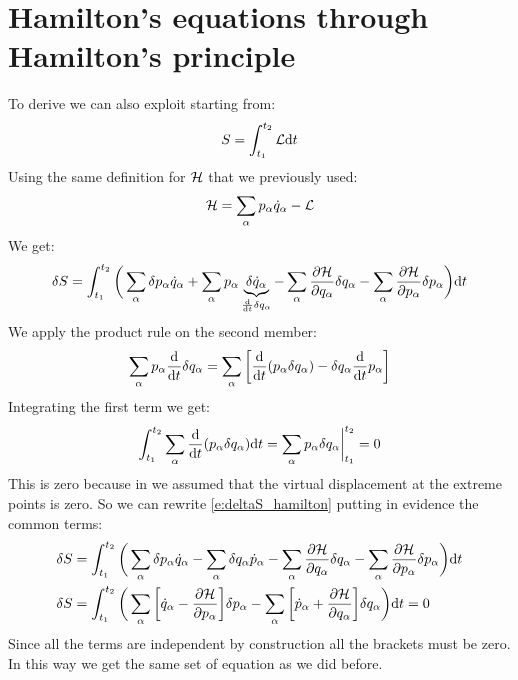 \section{Hamilton's equations through Hamilton's principle}
To derive \hamiltonref\;we can also exploit \hpquotemath\;starting from:
\begin{equation}
    S = \int_{t_1}^{t_2}\mathcal{L} \mathrm{d}t
\end{equation}
Using the same definition for $\mathcal{H}$ that we previously used:
\begin{equation}
    \mathcal{H} = \displaystyle\sum_{\alpha}p_{\alpha}\dot{q}_{\alpha} - \mathcal{L}
\end{equation}
We get:
\begin{equation} \label{e:deltaS_hamilton}
    \delta S = \int_{t_1}^{t_2}\bigg(\displaystyle\sum_{\alpha}\delta p_{\alpha}\dot{q}_{\alpha} + \displaystyle\sum_{\alpha} p_{\alpha} \underbrace{\delta \dot{q}_{\alpha}}_{\frac{\mathrm{d}}{\mathrm{d}t}\delta q_{\alpha}} - \displaystyle\sum_{\alpha} \dfrac{\partial \mathcal{H}}{\partial q_{\alpha}} \delta q_{\alpha}- \displaystyle\sum_{\alpha} \dfrac{\partial \mathcal{H}}{\partial p_{\alpha}} \delta p_{\alpha}\bigg) \mathrm{d}t
\end{equation}
We apply the product rule on the second member:
\begin{equation}
    \displaystyle\sum_{\alpha} p_{\alpha} \dfrac{\mathrm{d} }{\mathrm{d}t}\delta q_{\alpha} = \displaystyle\sum_{\alpha} \bigg[ \dfrac{\mathrm{d} }{\mathrm{d}t}(p_{\alpha} \delta q_{\alpha}) -  \delta q_{\alpha}\dfrac{\mathrm{d} }{\mathrm{d}t}p_{\alpha}\bigg]
\end{equation}
Integrating the first term we get:
\begin{equation}
    \int_{t_1}^{t_2} \displaystyle\sum_{\alpha} \dfrac{\mathrm{d} }{\mathrm{d}t}(p_{\alpha} \delta q_{\alpha}) \mathrm{d}t = \displaystyle\sum_{\alpha} p_{\alpha} \delta q_{\alpha} \bigg|_{t_1}^{t_2} = 0
\end{equation}
This is zero because in \hpquotemath\;we assumed that the virtual displacement at the extreme points is zero. So we can rewrite \eqref{e:deltaS_hamilton} putting in evidence the common terms:
\begin{equation}
    \begin{split}
        \delta S &= \int_{t_1}^{t_2}\bigg(\displaystyle\sum_{\alpha}\delta p_{\alpha}\dot{q}_{\alpha} - \displaystyle\sum_{\alpha} \delta q_{\alpha}\dot{p}_{\alpha} - \displaystyle\sum_{\alpha} \dfrac{\partial \mathcal{H}}{\partial q_{\alpha}} \delta q_{\alpha}- \displaystyle\sum_{\alpha} \dfrac{\partial \mathcal{H}}{\partial p_{\alpha}} \delta p_{\alpha}\bigg) \mathrm{d}t \\
        \delta S &= \int_{t_1}^{t_2}\bigg(\displaystyle\sum_{\alpha}\bigg[\dot{q}_{\alpha} - \dfrac{\partial \mathcal{H}}{\partial p_{\alpha}}\bigg] \delta p_{\alpha} - \displaystyle\sum_{\alpha} \bigg[\dot{p}_{\alpha} + \dfrac{\partial \mathcal{H}}{\partial q_{\alpha}} \bigg]\delta q_{\alpha}\bigg) \mathrm{d}t = 0
    \end{split}
\end{equation}
Since all the terms are independent by construction all the brackets must be zero. In this way we get the same set of equation as we did before.
